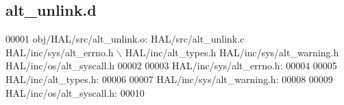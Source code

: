 \subsection{alt\+\_\+unlink.\+d}
\label{alt__unlink_8d_source}

\begin{DoxyCode}
00001 obj/HAL/src/alt\_unlink.o: HAL/src/alt\_unlink.c HAL/inc/sys/alt_errno.h \(\backslash\)
 HAL/inc/alt\_types.h HAL/inc/sys/alt\_warning.h HAL/inc/os/alt\_syscall.h
00002 
00003 HAL/inc/sys/alt_errno.h:
00004 
00005 HAL/inc/alt\_types.h:
00006 
00007 HAL/inc/sys/alt\_warning.h:
00008 
00009 HAL/inc/os/alt\_syscall.h:
00010 \end{DoxyCode}
